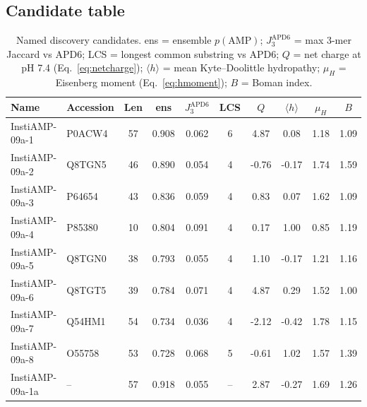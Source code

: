 \subsection{Candidate table}
\begin{table}[h]\centering\small
\caption{Named discovery candidates. ens = ensemble $p(\mathrm{AMP})$;
$J_3^{\mathrm{APD6}}$ = max 3-mer Jaccard vs APD6; LCS = longest common
substring vs APD6; $Q$ = net charge at pH 7.4 (Eq.~\eqref{eq:netcharge});
$\langle h\rangle$ = mean Kyte--Doolittle hydropathy; $\mu_H$ = Eisenberg
moment (Eq.~\eqref{eq:hmoment}); $B$ = Boman index.}
\label{tab:candidates}
\begin{tabular}{llcccccccc}
\hline
Name & Accession & Len & ens & $J_3^{\mathrm{APD6}}$ & LCS & $Q$ & $\langle h\rangle$ & $\mu_H$ & $B$ \\
\hline
InstiAMP-09a-1 & P0ACW4 & 57 & 0.908 & 0.062 & 6 & 4.87 & 0.08 & 1.18 & 1.09 \\
InstiAMP-09a-2 & Q8TGN5 & 46 & 0.890 & 0.054 & 4 & -0.76 & -0.17 & 1.74 & 1.59 \\
InstiAMP-09a-3 & P64654 & 43 & 0.836 & 0.059 & 4 & 0.83 & 0.07 & 1.62 & 1.09 \\
InstiAMP-09a-4 & P85380 & 10 & 0.804 & 0.091 & 4 & 0.17 & 1.00 & 0.85 & 1.19 \\
InstiAMP-09a-5 & Q8TGN0 & 38 & 0.793 & 0.055 & 4 & 1.10 & -0.17 & 1.21 & 1.16 \\
InstiAMP-09a-6 & Q8TGT5 & 39 & 0.784 & 0.071 & 4 & 4.87 & 0.29 & 1.52 & 1.00 \\
InstiAMP-09a-7 & Q54HM1 & 54 & 0.734 & 0.036 & 4 & -2.12 & -0.42 & 1.78 & 1.15 \\
InstiAMP-09a-8 & O55758 & 53 & 0.728 & 0.068 & 5 & -0.61 & 1.02 & 1.57 & 1.39 \\
InstiAMP-09a-1a & -- & 57 & 0.918 & 0.055 & -- & 2.87 & -0.27 & 1.69 & 1.26 \\
\hline
\end{tabular}
\end{table}

